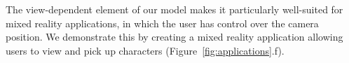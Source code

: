 
The view-dependent element of our model makes it particularly well-suited for mixed reality applications, in which the user has control over the camera position. We demonstrate this by creating a mixed reality application allowing users to view and pick up characters (Figure~\ref{fig:applications}.f).






















